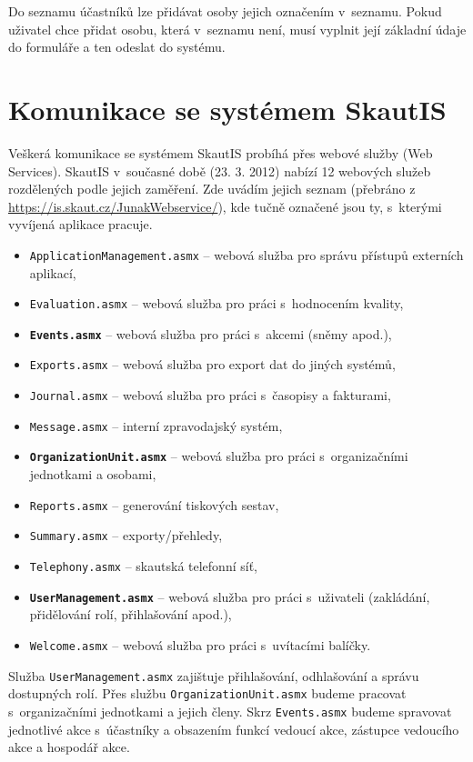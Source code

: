 \documentclass[thesis=B,czech]{FITthesis}[2012/04/27]
\begin{document}
Do seznamu účastníků lze přidávat osoby jejich označením v~seznamu. Pokud uživatel chce přidat osobu, která v~seznamu není, musí vyplnit její základní údaje do formuláře a ten odeslat do systému.

\section{Komunikace se systémem SkautIS}\label{sec:skautisComunication}
Veškerá komunikace se systémem SkautIS probíhá přes webové služby (Web Services). SkautIS v~současné době (23. 3. 2012) nabízí 12 webových služeb rozdělených podle jejich zaměření. Zde uvádím jejich seznam (přebráno z \url{https://is.skaut.cz/JunakWebservice/}), kde tučně označené jsou ty, s~kterými vyvíjená aplikace pracuje. 

\begin{itemize}
	\item \texttt{ApplicationManagement.asmx} -- webová služba pro správu přístupů externích aplikací,
	\item \texttt{Evaluation.asmx} -- webová služba pro práci s~hodnocením kvality,
	\item \texttt{\textbf{Events.asmx}} -- webová služba pro práci s~akcemi (sněmy apod.),
	\item \texttt{Exports.asmx} -- webová služba pro export dat do jiných systémů,
	\item \texttt{Journal.asmx} -- webová služba pro práci s~časopisy a fakturami,
	\item \texttt{Message.asmx} -- interní zpravodajský systém,
	\item \texttt{\textbf{OrganizationUnit.asmx}} -- webová služba pro práci s~organizačními jednotkami a osobami,
	\item \texttt{Reports.asmx} -- generování tiskových sestav,
	\item \texttt{Summary.asmx} -- exporty/přehledy,
	\item \texttt{Telephony.asmx} -- skautská telefonní síť,
	\item \texttt{\textbf{UserManagement.asmx}} -- webová služba pro práci s~uživateli (zakládání, přidělování rolí, přihlašování apod.),
	\item \texttt{Welcome.asmx} -- webová služba pro práci s~uvítacími balíčky.
\end{itemize}

Služba \texttt{UserManagement.asmx} zajištuje přihlašování, odhlašování a správu dostupných rolí. Přes službu \texttt{OrganizationUnit.asmx} budeme pracovat s~organizačními jednotkami a jejich členy. Skrz \texttt{Events.asmx} budeme spravovat jednotlivé akce s~účastníky a obsazením funkcí vedoucí akce, zástupce vedoucího akce a hospodář akce.
\end{document}
